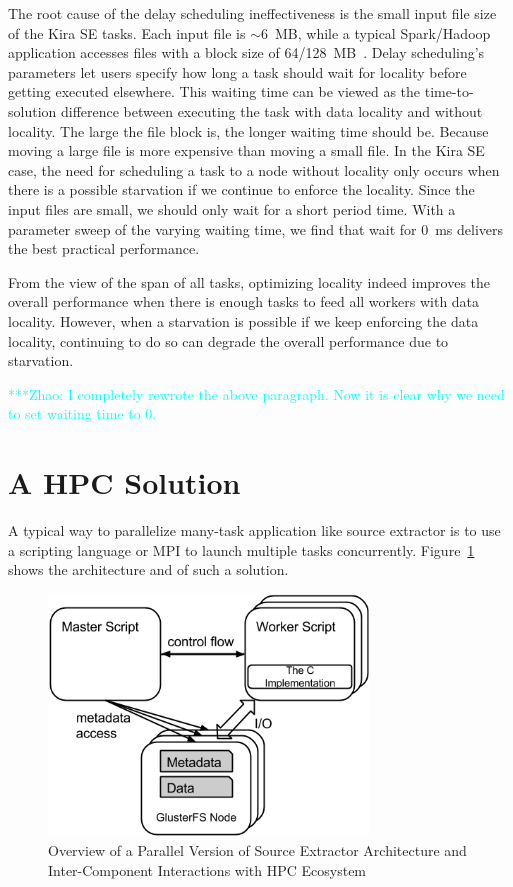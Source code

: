 \documentclass[conference]{IEEEtran}
\newcommand{\zhaonote}[1]{{\textcolor{cyan}    { ***Zhao:      #1 }}}
\newcommand{\zhaonote}[1]{}
\newcommand{\up}{\vspace*{-1em}}
\begin{document}
The root cause of the delay scheduling ineffectiveness is the small input file size of the Kira SE tasks. 
Each input file is $\sim$6~MB, while a typical Spark/Hadoop application accesses files with a block size of 64/128~MB~\cite{shvachko10}.
Delay scheduling's parameters let users specify how long a task should wait for locality before getting executed elsewhere.
This waiting time can be viewed as the time-to-solution difference between executing the task with data locality and without locality.
The large the file block is, the longer waiting time should be. Because moving a large file is more expensive than moving
a small file. In the Kira SE case, the need for scheduling a task to a node without locality only occurs when there is a possible
starvation if we continue to enforce the locality. Since the input files are small, we should only wait for a short period time. With
a parameter sweep of the varying waiting time, we find that wait for 0~ms delivers the best practical performance.

From the view of the span of all tasks, optimizing locality indeed improves the overall performance when there is enough
tasks to feed all workers with data locality. However, when a starvation is possible if we keep
enforcing the data locality, continuing to do so can degrade the overall performance due to starvation.

\zhaonote{I completely rewrote the above paragraph. Now it is clear why we need to set waiting time to 0.}

\section{A HPC Solution}
A typical way to parallelize many-task application like source extractor is to use a scripting language
or MPI to launch multiple tasks concurrently. Figure~\ref{fig:hpc-architecture} shows the architecture and
of such a solution.

\begin{figure}[t]
	\begin{center}
		\includegraphics[width=85mm]{pictures/HPC-Architecture}
		\caption{Overview of a Parallel Version of Source Extractor Architecture and Inter-Component Interactions with HPC Ecosystem}
		\label{fig:hpc-architecture}
		\up\up
  	\end{center}
\end{figure}
\end{document}
